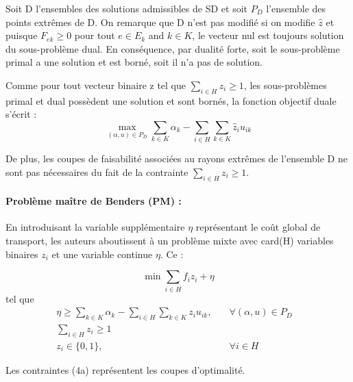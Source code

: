 Soit D l'ensembles des solutions admissibles de SD et soit $P_D$ l'ensemble des points extrêmes de D. On remarque que D n'est pas modifié si on modifie $\hat{z}$ et puisque $F_{ek} \geq 0$ pour tout $e \in E_k$ and $k \in K$, le vecteur nul est toujours solution du sous-problème dual. En conséquence, par dualité forte, soit le sous-problème primal a une solution et est borné, soit il n'a pas de solution.

Comme pour tout vecteur binaire z tel que $\sum_{i \in H} z_i \ge 1$, les sous-problèmes primal et dual possèdent une solution et sont bornés, la fonction objectif duale s'écrit :
\[ \max_{(\alpha,u) \in P_D} \sum_{k \in K}\alpha_k - \sum_{i \in H}\sum_{k \in K} \hat{z}_iu_{ik}\]

De plus, les coupes de faisabilité associées au rayons extrêmes de l'ensemble D ne sont pas nécessaires du fait de la contrainte $\sum_{i \in H} z_i \ge 1$. 




\paragraph{Problème maître de Benders (PM) :} En introduisant la variable supplémentaire $\eta$ représentant le coût global de transport, les auteurs aboutissent à un problème mixte avec card(H) variables binaires $z_i$ et une variable continue $\eta$. Ce :  


\[ \min \sum_{i \in H} f_iz_i + \eta\]
tel que
\begin{subequations}
    \begin{align}
       \eta \ge \sum_{k \in K}\alpha_k - \sum_{i \in H}\sum_{k \in K} z_iu_{ik}, \quad &\forall{(\alpha,u) \in P_D}&\\
       \sum_{i \in H} z_i \ge 1 \quad &&\\
        z_i \in \{0,1\}, \quad & \forall{i \in H}&
    \end{align}
\end{subequations}
	

Les contraintes (4a) représentent les coupes d'optimalité.


